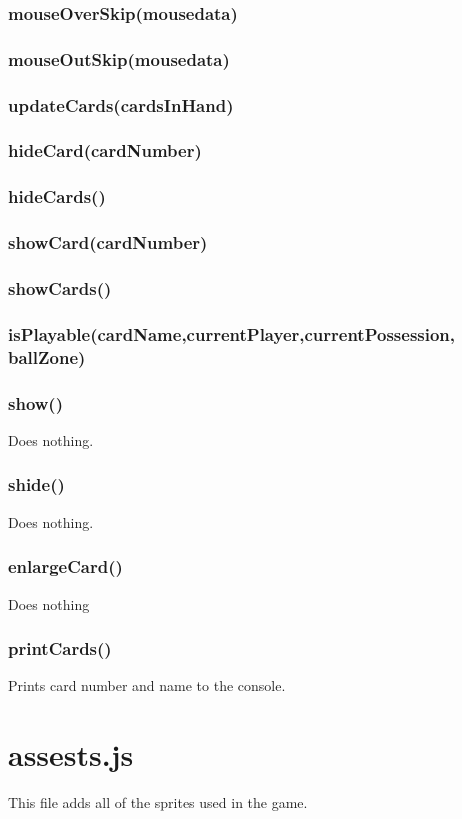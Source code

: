 \documentclass[12pt]{article}
\begin{document}
\subsubsection*{mouseOverSkip(mousedata)}
\subsubsection*{mouseOutSkip(mousedata)}
\subsubsection*{updateCards(cardsInHand)}
\subsubsection*{hideCard(cardNumber)}
\subsubsection*{hideCards()}
\subsubsection*{showCard(cardNumber)}
\subsubsection*{showCards()}
\subsubsection*{isPlayable(cardName,currentPlayer,currentPossession,
ballZone)}
\subsubsection*{show()}
Does nothing.
\subsubsection*{shide()}
Does nothing.
\subsubsection*{enlargeCard()}
Does nothing
\subsubsection*{printCards()}
Prints card number and name to the console. 

\section*{assests.js}
This file adds all of the sprites used in the game. 
\end{document}
